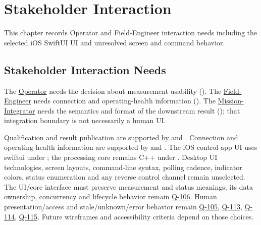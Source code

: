 \chapter{Stakeholder Interaction}
\label{Section:UserInterfaceDesignResponsibility}
This chapter records Operator and Field-Engineer interaction needs including the selected iOS SwiftUI UI and unresolved screen and command behavior.


\section{Stakeholder Interaction Needs}
The \hyperref[Stakeholder:Operator]{Operator} needs the decision about measurement usability (). The \hyperref[Stakeholder:Field-Engineer]{Field-Engineer} needs connection and operating-health information (). The \hyperref[Stakeholder:Mission-Integrator]{Mission-Integrator} needs the semantics and format of the downstream result (); that integration boundary is not necessarily a human UI.

Qualification and result publication are supported by  and . Connection and operating-health information are supported by  and . The iOS control-app UI uses \gls{swiftui} under ; the processing core remains C++ under . Desktop UI technologies, screen layouts, command-line syntax, polling cadence, indicator colors, status enumeration and any reverse control channel remain unselected. The UI/core interface must preserve measurement and status meanings; its data ownership, concurrency and lifecycle behavior remain \hyperref[Question:Q-106]{Q-106}. Human presentation/access and stale/unknown/error behavior remain \hyperref[Question:Q-105]{Q-105}, \hyperref[Question:Q-113]{Q-113}, \hyperref[Question:Q-114]{Q-114}, \hyperref[Question:Q-115]{Q-115}. Future wireframes and accessibility criteria depend on those choices.
